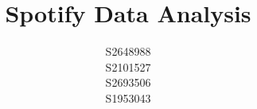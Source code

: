\documentclass{article}
\title{Spotify Data Analysis}
\author{
  S2648988\\
  \And
  S2101527\\
 \And
  S2693506\\
  \And
  S1953043\\
}
\begin{document}
\maketitle
 \textit{}
\end{document}
